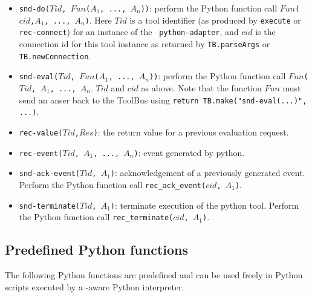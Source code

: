 \begin{itemize}
\item {\tt snd-do($Tid$, $Fun$($A_1$, ..., $A_n$))}: perform the Python
function call
{\tt $Fun$($cid$,$A_1$, ..., $A_n$)}. Here $Tid$ is a tool identifier
(as produced by {\tt execute} or {\tt rec-connect}) for an instance of the {\tt
python-adapter}, and $cid$ is the connection id for this tool instance 
as returned by {\tt TB.parseArgs} or {\tt TB.newConnection}.
\item {\tt snd-eval($Tid$, $Fun$($A_1$, ..., $A_n$))}: perform the Python
function call
{\tt $Fun$($Tid$, $A_1$, ..., $A_n$}. $Tid$ and $cid$ as above.
Note that the function {\tt $Fun$} must send an anser back to the
ToolBus using {\tt return TB.make("snd-eval(...)", ...)}.
\item {\tt rec-value($Tid$,$Res$)}: the return value for a previous evaluation request.
\item {\tt rec-event($Tid$, $A_1$, ..., $A_n$)}: event generated by python.
\item {\tt snd-ack-event($Tid$, $A_1$)}: acknowledgement of
a previously generated event. Perform the Python function call
{\tt rec\_ack\_event($cid$, $A_1$)}.
\item {\tt snd-terminate($Tid$, $A_1$)}: terminate execution of the
python tool. Perform the Python function call
{\tt rec\_terminate($cid$, $A_1$)}.
\end{itemize}


\subsection{\label{Python-functions}Predefined Python functions}
The following Python functions are predefined and can be used freely in Python
scripts executed by a \TB -aware Python interpreter.

